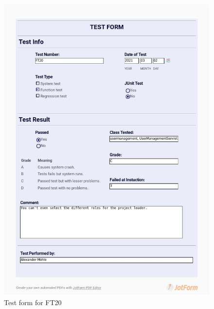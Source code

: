 \documentclass{article}
\begin{document}
 \begin{figure}
     \centering
     \includegraphics[width=13cm]{images/2021-03-02_Alexander_FT20_001}
     \renewcommand\figurename{Figure}
     \caption{Test form for FT20}
     \label{fig:my_label}
 \end{figure}
 
\end{document}
